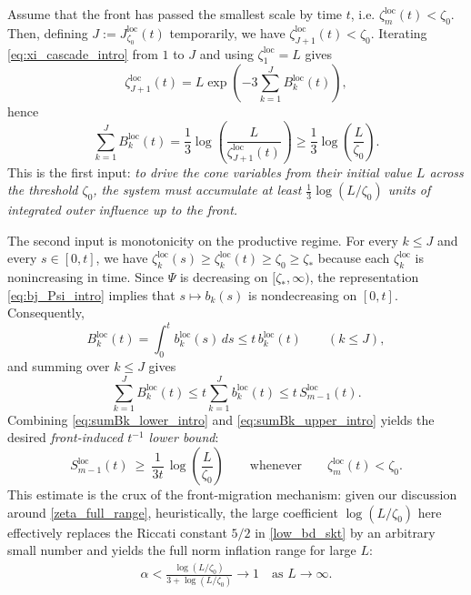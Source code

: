 \documentclass[reqno,11pt]{amsart}
\begin{document}
 Assume that the front has passed the smallest scale by time \(t\), i.e.
\(\zeta_m^{\mathrm{loc}}(t)<\zeta_0\).
Then, defining \(J:=J_{\zeta_0}^{\mathrm{loc}}(t)\) temporarily, we have \(\zeta_{J+1}^{\mathrm{loc}}(t)<\zeta_0\).
Iterating \eqref{eq:xi_cascade_intro} from \(1\) to \(J\) and using \(\zeta_1^{\mathrm{loc}}=L\) gives
\[
    \zeta_{J+1}^{\mathrm{loc}}(t)
    =
    L\exp\!\left(-3\sum_{k=1}^{J} B_k^{\mathrm{loc}}(t)\right),
\]
hence
\begin{equation}\label{eq:sumBk_lower_intro}
    \sum_{k=1}^{J} B_k^{\mathrm{loc}}(t)
    =
    \frac13\log\!\left(\frac{L}{\zeta_{J+1}^{\mathrm{loc}}(t)}\right)
    \ge
    \frac13\log\!\left(\frac{L}{\zeta_0}\right).
\end{equation}
This is the first input: \emph{
to drive the cone variables from their initial value $L$ across the threshold $\zeta_0$,
the system must
accumulate at least \(\frac13\log(L/\zeta_0)\) units of integrated outer influence up to the front.}

The second input is monotonicity on the productive regime.
For every \(k\le J\) and every \(s\in[0,t]\), we have
\(
\zeta_k^{\mathrm{loc}}(s)\ge \zeta_k^{\mathrm{loc}}(t)\ge \zeta_0\ge \zeta_\ast
\)
because each \(\zeta_k^{\mathrm{loc}}\) is nonincreasing in time.
Since \(\Psi\) is decreasing on \([\zeta_\ast,\infty)\), the representation \eqref{eq:bj_Psi_intro}
implies that \(s\mapsto b_k(s)\) is nondecreasing on \([0,t]\).
Consequently,
\[
    B_k^{\mathrm{loc}}(t)=\int_0^t b_k^{\mathrm{loc}}(s)\,ds \le t\,b_k^{\mathrm{loc}}(t)
    \qquad (k\le J),
\]
and summing over \(k\le J\) gives
\begin{equation}\label{eq:sumBk_upper_intro}
    \sum_{k=1}^{J} B_k^{\mathrm{loc}}(t)
    \le
    t\sum_{k=1}^{J} b_k^{\mathrm{loc}}(t)
    \le
    t\,S_{m-1}^{\mathrm{loc}}(t).
\end{equation}
Combining \eqref{eq:sumBk_lower_intro} and \eqref{eq:sumBk_upper_intro} yields the desired
\emph{front-induced \(t^{-1}\) lower bound}:
\begin{equation*}
    S_{m-1}^{\mathrm{loc}}(t)\ \ge\ \frac{1}{3t}\,\log\!\left(\frac{L}{\zeta_0}\right)
    \qquad\text{whenever}\qquad \zeta_m^{\mathrm{loc}}(t)<\zeta_0.
\end{equation*}
This estimate is the crux of the front-migration mechanism: given our discussion around \eqref{zeta_full_range}, heuristically, the large coefficient $\log (L/\zeta_0)$ here effectively replaces the Riccati constant $5/2$ in \eqref{low_bd_skt} by an arbitrary small number and yields the full norm inflation range for large $L$:
    \begin{align*}
        \alpha < \frac{\log (L/\zeta_0)}{3+\log(L/\zeta_0)}\to 1 \quad \text{as }L\to\infty.
    \end{align*}
\end{document}
